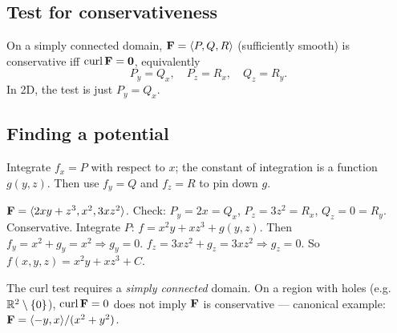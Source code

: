 \subsection{Test for conservativeness}
On a simply connected domain, $\mathbf{F} = \langle P, Q, R \rangle$ (sufficiently smooth) is conservative iff $\operatorname{curl} \mathbf{F} = \mathbf{0}$, equivalently
\[ P_y = Q_x, \quad P_z = R_x, \quad Q_z = R_y. \]
In 2D, the test is just $P_y = Q_x$.

\subsection{Finding a potential}
Integrate $f_x = P$ with respect to $x$; the constant of integration is a function $g(y, z)$.
Then use $f_y = Q$ and $f_z = R$ to pin down $g$.

\begin{example}
$\mathbf{F} = \langle 2xy + z^3, x^2, 3x z^2 \rangle$. Check: $P_y = 2x = Q_x$, $P_z = 3z^2 = R_x$, $Q_z = 0 = R_y$.
Conservative. Integrate $P$: $f = x^2 y + x z^3 + g(y,z)$. Then $f_y = x^2 + g_y = x^2 \Rightarrow g_y = 0$.
$f_z = 3x z^2 + g_z = 3xz^2 \Rightarrow g_z = 0$. So $f(x,y,z) = x^2 y + x z^3 + C$.
\end{example}

\begin{pitfallbox}
The curl test requires a \emph{simply connected} domain. On a region with holes (e.g.\ $\mathbb{R}^2 \setminus \{0\}$), $\operatorname{curl} \mathbf{F} = 0$ does not imply $\mathbf{F}$ is conservative --- canonical
example: $\mathbf{F} = \langle -y, x \rangle / (x^2 + y^2)$.
\end{pitfallbox}
